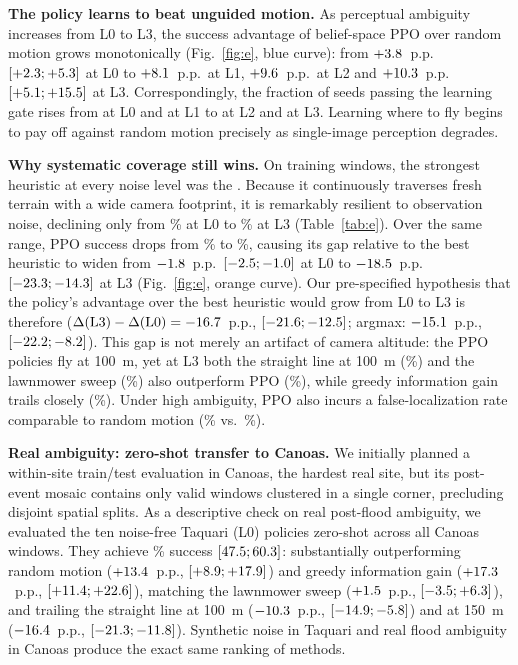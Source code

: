 \textbf{The policy learns to beat unguided motion.}
As perceptual ambiguity increases from L0 to L3, the success advantage of belief-space PPO over random motion grows monotonically (Fig.~\ref{fig:e}, blue curve): from $+3.8$~p.p.\ $[+2.3; +5.3]$ at L0 to $+8.1$~p.p.\ at L1, $+9.6$~p.p.\ at L2 and $+10.3$~p.p.\ $[+5.1; +15.5]$ at L3. Correspondingly, the fraction of seeds passing the learning gate rises from \eGateLZero{} at L0 and \eGateLOne{} at L1 to \eGateLTwo{} at L2 and \eGateLThree{} at L3. Learning where to fly begins to pay off against random motion precisely as single-image perception degrades.

\textbf{Why systematic coverage still wins.}
On training windows, the strongest heuristic at every noise level was the \eBestName{}. Because it continuously traverses fresh terrain with a wide camera footprint, it is remarkably resilient to observation noise, declining only from \eSuccBestLZero\% at L0 to \eSuccBestLThree\% at L3 (Table~\ref{tab:e}). Over the same range, PPO success drops from \eSuccPpoLZero\% to \eSuccPpoLThree\%, causing its gap relative to the best heuristic to widen from $-1.8$~p.p.\ $[-2.5; -1.0]$ at L0 to $-18.5$~p.p.\ $[-23.3; -14.3]$ at L3 (Fig.~\ref{fig:e}, orange curve). Our pre-specified hypothesis that the policy's advantage over the best heuristic would grow from L0 to L3 is therefore \eThreeVerdict{} ($\Delta(\mathrm{L3})-\Delta(\mathrm{L0})=-16.7$~p.p., $[-21.6; -12.5]$; argmax: $-15.1$~p.p., $[-22.2; -8.2]$). This gap is not merely an artifact of camera altitude: the PPO policies fly at 100~m, yet at L3 both the straight line at 100~m (\eSuccStraightLThree\%) and the lawnmower sweep (\eSuccLawnmowerLThree\%) also outperform PPO (\eSuccPpoLThree\%), while greedy information gain trails closely (\eSuccGreedyLThree\%). Under high ambiguity, PPO also incurs a false-localization rate comparable to random motion (\eFalseLocPpoLThree\% vs.\ \eFalseLocRandLThree\%).

\textbf{Real ambiguity: zero-shot transfer to Canoas.}
We initially planned a within-site train/test evaluation in Canoas, the hardest real site, but its post-event mosaic contains only \eCanoasWindows{} valid windows clustered in a single corner, precluding disjoint spatial splits. As a descriptive check on real post-flood ambiguity, we evaluated the ten noise-free Taquari (L0) policies zero-shot across all Canoas windows. They achieve \eZsPpo\% success $[47.5; 60.3]$: substantially outperforming random motion ($+13.4$~p.p., $[+8.9; +17.9]$) and greedy information gain ($+17.3$~p.p., $[+11.4; +22.6]$), matching the lawnmower sweep ($+1.5$~p.p., $[-3.5; +6.3]$), and trailing the straight line at 100~m ($-10.3$~p.p., $[-14.9; -5.8]$) and at 150~m ($-16.4$~p.p., $[-21.3; -11.8]$). Synthetic noise in Taquari and real flood ambiguity in Canoas produce the exact same ranking of methods.

